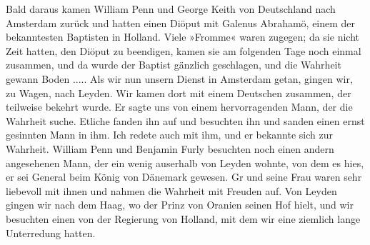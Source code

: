 Bald daraus kamen William Penn und George Keith von
Deutschland nach Amsterdam zurück und hatten einen Diöput mit
Galenus Abrahamö, einem der bekanntesten Baptisten in Holland.
Viele »Fromme« waren zugegen; da sie nicht Zeit hatten, den
Diöput zu beendigen, kamen sie am folgenden Tage noch einmal
zusammen, und da wurde der Baptist gänzlich geschlagen, und die
Wahrheit gewann Boden ..... Als wir nun unsern Dienst in
Amsterdam getan, gingen wir, zu Wagen, nach Leyden. Wir
kamen dort mit einem Deutschen zusammen, der teilweise bekehrt
wurde. Er sagte uns von einem hervorragenden Mann, der die
Wahrheit suche. Etliche fanden ihn auf und besuchten ihn und
sanden einen ernst gesinnten Mann in ihm. Ich redete auch mit
ihm, und er bekannte sich zur Wahrheit. William Penn und Benjamin
Furly besuchten noch einen andern angesehenen Mann, der ein wenig
auserhalb von Leyden wohnte, von dem es hies, er sei General
beim König von Dänemark gewesen. Gr und seine Frau waren
sehr liebevoll mit ihnen und nahmen die Wahrheit mit Freuden auf.
Von Leyden gingen wir nach dem Haag, wo der Prinz von
Oranien seinen Hof hielt, und wir besuchten einen von der Regierung
von Holland, mit dem wir eine ziemlich lange Unterredung hatten.


